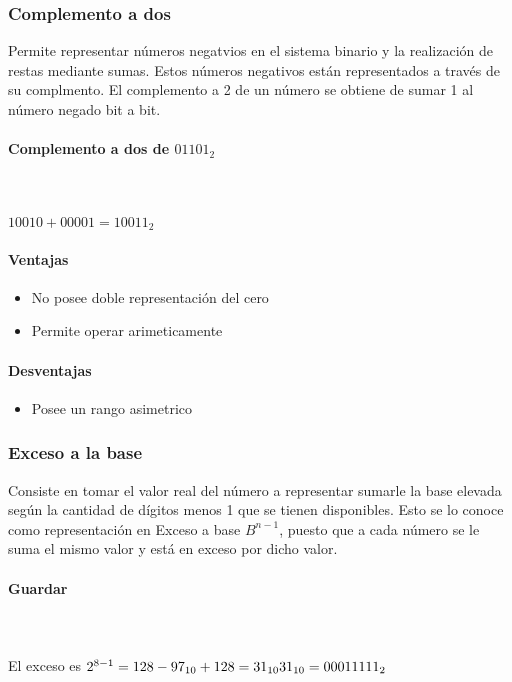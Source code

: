 \subsubsection{Complemento a dos}
Permite representar números negatvios en el sistema binario y la realización de restas mediante sumas. Estos números negativos están representados a través de su complmento. El complemento a 2 de un número se obtiene de sumar 1 al número negado bit a bit.

\paragraph{Complemento a dos de $01101_2$}\mbox{}\\\\
$10010 + 00001 = 10011_2$

\paragraph{Ventajas}
\begin{itemize}
\item No posee doble representación del cero
\item Permite operar arimeticamente
\end{itemize}

\paragraph{Desventajas}
\begin{itemize}
\item Posee un rango asimetrico
\end{itemize}

\subsubsection{Exceso a la base}
Consiste en tomar el valor real del número a representar sumarle la base elevada según la cantidad de dígitos menos 1 que se tienen disponibles. Esto se lo conoce como representación en Exceso a base $B^{n-1}$, puesto que a cada número se le suma
el mismo valor y está en exceso por dicho valor.

\paragraph{Guardar}\mbox{}\\\\
El exceso es $2^{8-1}=128\\
-97_{10} + 128 = 31_{10}\\
31_{10} = 00011111_{2}$

